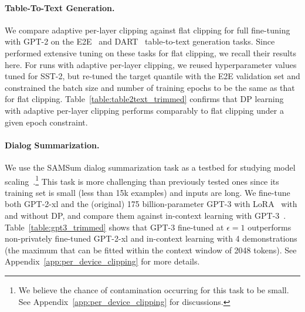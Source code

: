 \paragraph{Table-To-Text Generation.}
We compare adaptive per-layer clipping against flat clipping for full fine-tuning with GPT-2 on the E2E~\citep{novikova2017e2e} and DART~\citep{nan2020dart} table-to-text generation tasks. 
Since~\cite{li2022large} performed extensive tuning on these tasks for flat clipping, we recall their results here.
For runs with adaptive per-layer clipping, we reused hyperparameter values tuned for SST-2, but re-tuned the target quantile with the E2E validation set and constrained the batch size and number of training epochs to be the same as that for flat clipping.
Table~\ref{table:table2text_trimmed} confirms that DP learning with adaptive per-layer clipping performs comparably to flat clipping under a given epoch constraint.

\paragraph{Dialog Summarization.}\label{exp:summarization}
We use the SAMSum dialog summarization task as a testbed for studying model scaling~\citep{gliwa2019samsum}.\footnote{We believe the chance of contamination occurring for this task to be small. See Appendix~\ref{app:per_device_clipping} for discussions.}
This task is more challenging than previously tested ones since its training set is small (less than 15k examples) and inputs are long. 
We fine-tune both GPT-2-xl and the (original) 175 billion-parameter GPT-3 with LoRA~\citep{hu2021lora} with and without DP, and compare them against in-context learning with GPT-3~\citep{brown2020language}.
Table~\ref{table:gpt3_trimmed} shows that GPT-3 fine-tuned at $\epsilon=1$ outperforms non-privately fine-tuned GPT-2-xl and in-context learning with 4 demonstrations (the maximum that can be fitted within the context window of 2048 tokens). 
See Appendix~\ref{app:per_device_clipping} for more details.
